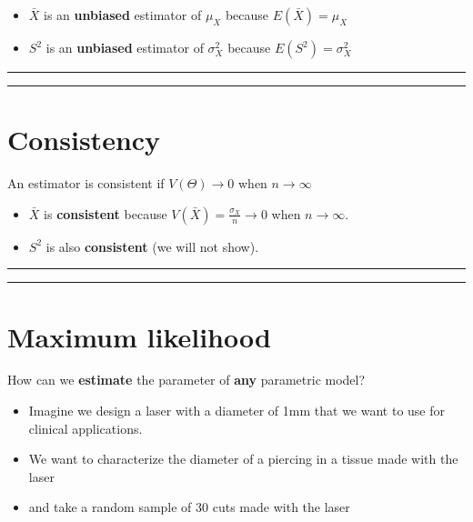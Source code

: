 \documentclass[
]{book}
\begin{document}
\begin{itemize}
\item
  \(\bar{X}\) is an \textbf{unbiased} estimator of \(\mu_X\) because \(E(\bar{X})=\mu_X\)
\item
  \(S^2\) is an \textbf{unbiased} estimator of \(\sigma^2_X\) because \(E(S^2)=\sigma^2_X\)
\end{itemize}

\begin{center}\rule{0.5\linewidth}{0.5pt}\end{center}

\begin{center}\rule{0.5\linewidth}{0.5pt}\end{center}

\hypertarget{consistency}{%
\section{Consistency}\label{consistency}}

An estimator is consistent if \(V(\Theta) \rightarrow 0\) when \(n \rightarrow \infty\)

\begin{itemize}
\item
  \(\bar{X}\) is \textbf{consistent} because \(V(\bar{X})=\frac{\sigma_X}{n}\rightarrow 0\) when \(n \rightarrow \infty\).
\item
  \(S^2\) is also \textbf{consistent} (we will not show).
\end{itemize}

\begin{center}\rule{0.5\linewidth}{0.5pt}\end{center}

\begin{center}\rule{0.5\linewidth}{0.5pt}\end{center}

\hypertarget{maximum-likelihood-1}{%
\section{Maximum likelihood}\label{maximum-likelihood-1}}

How can we \textbf{estimate} the parameter of \textbf{any} parametric model?

\begin{itemize}
\item
  Imagine we design a laser with a diameter of 1mm that we want to use for clinical applications.
\item
  We want to characterize the diameter of a piercing in a tissue made with the laser
\item
  and take a random sample of 30 cuts made with the laser
\end{itemize}
\end{document}
